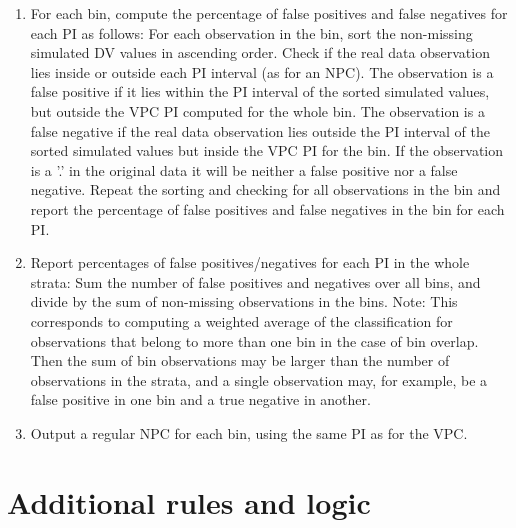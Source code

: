 \begin{enumerate}
	\item For each bin, compute the percentage of false positives and false negatives for each PI as follows: 
For each observation in the bin, sort the non-missing simulated DV values in ascending order. Check if the real data observation lies inside or outside each PI interval (as for an NPC). The observation is a false positive if it lies within the PI interval of the sorted simulated values, but outside the VPC PI computed for the whole bin. The observation is a false negative if the real data observation lies outside the PI interval of the sorted simulated values but inside the VPC PI for the bin. If the observation is a '.' in the original data it will be neither a false positive nor a false negative. Repeat the sorting and checking for all observations in the bin and report the percentage of false positives and false negatives in the bin for each PI.

	\item Report percentages of false positives/negatives for each PI in the whole strata:
Sum the number of false positives and negatives over all bins, and divide by the sum of non-missing observations in  the bins. Note: This corresponds to computing a weighted average of the classification for observations that belong to more than one bin in the case of bin overlap. Then the sum of bin observations may be larger than the number of observations in the strata, and a single observation may, for example, be a false positive in one bin and a true negative in another. 

	\item Output a regular NPC for each bin, using the same PI as for the VPC.
\end{enumerate}


\section{Additional rules and logic}

